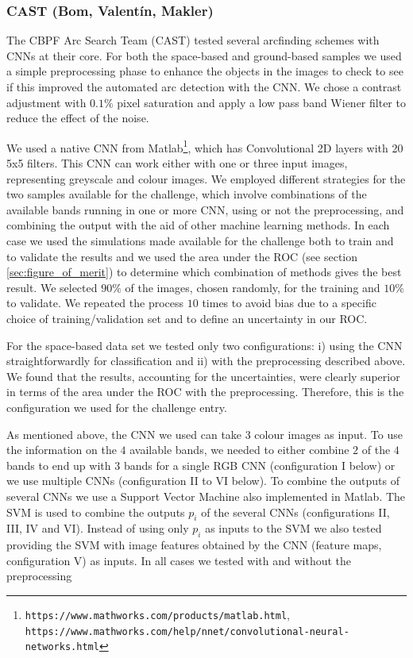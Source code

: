 \documentclass{aa}
\begin{document}
\subsubsection{CAST (Bom, Valent\'in, Makler)}
\label{sec:CAST}

The CBPF Arc Search Team (CAST) tested several arcfinding schemes with CNNs at their core.  
For both the space-based and ground-based samples we used a simple preprocessing phase to enhance the objects in the images to check to 
see if this improved the automated arc detection with the CNN. We chose a contrast adjustment with $0.1\%$ pixel saturation and apply a low pass band Wiener filter \citep{wiener1964extrapolation} to reduce the effect of the noise. 

We used a native CNN from Matlab\footnote{\texttt{https://www.mathworks.com/products/matlab.html}, \texttt{https://www.mathworks.com/help/nnet/convolutional-neural-networks.html}}, which has Convolutional 2D layers with 20 5x5 filters. This CNN can work either with one or three input images, representing greyscale and colour images.
We employed different strategies for the two samples available for the challenge, which involve combinations of the available bands running in one or more CNN, using or not the preprocessing, and combining the output with the aid of other machine learning methods.
In each case we used the simulations made available for the challenge both to train and to validate the results and we used the area under the ROC (see section \ref{sec:figure_of_merit}) to determine which combination of methods gives the best result.    
We selected 
$90\%$ of the images, chosen randomly, for the training and $10\%$ to validate. We repeated the process $10$ times to avoid bias due to a specific choice of training/validation set and to define an uncertainty in our ROC.

For the space-based data set we tested only two configurations: i) using the CNN straightforwardly for classification and ii) 
with the preprocessing described above. 
We found that the results, accounting for the uncertainties,  
were clearly superior in terms of the area under the ROC with the preprocessing. Therefore, this is the configuration we used for the challenge entry. 

As mentioned above, the CNN we used can take 3 colour images as input.  To use the information on the $4$ available bands, we needed to either combine $2$ of the $4$ bands to end up with $3$ bands for a single RGB CNN (configuration I below) or we use multiple CNNs (configuration II to VI below). To combine the outputs of several CNNs we use a Support Vector Machine \citep[hereafter SVM; see e.g., ][]{rebentrost2014quantum} also implemented in Matlab. The SVM is used to combine the outputs $p_i$ of the several CNNs (configurations II, III, IV and VI). Instead of using only $p_i$ as inputs to the SVM we also tested providing the SVM with image features obtained by the CNN (feature maps, configuration V) as inputs. In all cases we tested with and without the preprocessing
\end{document}
